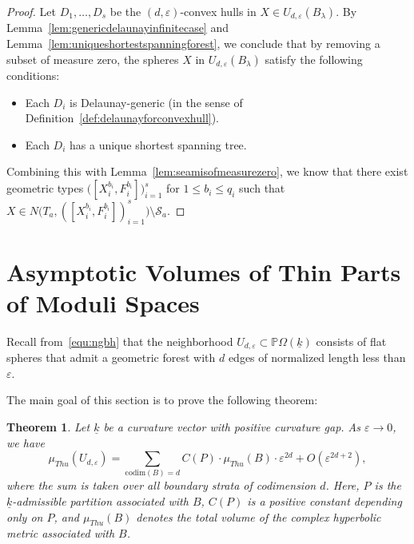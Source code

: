 \documentclass{compositio}
\numberwithin{equation}{section}
\numberwithin{figure}{section}
\theoremstyle{definition}
\theoremstyle{plain}
\newtheorem{theorem}[definition]{Theorem}
\begin{document}
{\begin{proof}
Let $D_1,\ldots,D_s$ be the $(d,\varepsilon)$-convex hulls in $X\in U_{d,\varepsilon}(B_\lambda)$. 
By Lemma~\ref{lem:genericdelaunayinfinitecase} and Lemma~\ref{lem:uniqueshortestspanningforest}, we conclude that by removing a subset of measure zero, the spheres $X$ in $U_{d,\varepsilon}(B_{\lambda})$ satisfy the following conditions:
\begin{itemize}
    \item Each $D_i$ is Delaunay-generic (in the sense of Definition~\ref{def:delaunayforconvexhull}).
    \item Each $D_i$ has a unique shortest spanning tree.
\end{itemize}
Combining this with Lemma~\ref{lem:seamisofmeasurezero}, we know that there exist geometric types $\Big([X_i^{b_i},F_i^{b_i}]\Big)_{i=1}^s$ for $1\le b_i \le q_i$ such that $X \in N\big(T_a, ([X_i^{b_i}, F_i^{b_i}])_{i=1}^s\big) \setminus \mathcal{S}_a.$
\end{proof}


\section{Asymptotic Volumes of Thin Parts of Moduli Spaces}\label{bigsec:measurebounds}

Recall from~\eqref{equ:ngbh} that the neighborhood $U_{d,\varepsilon} \subset \mathbb{P}\Omega(\underline{k})$ consists of flat spheres that admit a geometric forest with $d$ edges of normalized length less than $\varepsilon$.

The main goal of this section is to prove the following theorem:

\begin{theorem}\label{thm:main1}
Let $\underline{k}$ be a curvature vector with positive curvature gap. As $\varepsilon \to 0$, we have
\begin{equation}\label{equ:asymvolume}
    \mu_{Thu}(U_{d,\varepsilon}) =  \sum\limits_{\mathrm{codim}(B) = d} C(P)\cdot \mu_{Thu}(B)\cdot \varepsilon^{2d} + O(\varepsilon^{2d+2}),
\end{equation}
where the sum is taken over all boundary strata of codimension $d$. Here, $P$ is the $\underline{k}$-admissible partition associated with $B$, $C(P)$ is a positive constant depending only on $P$, and $\mu_{Thu}(B)$ denotes the total volume of the complex hyperbolic metric associated with $B$.
\end{theorem}

}
\end{document}
